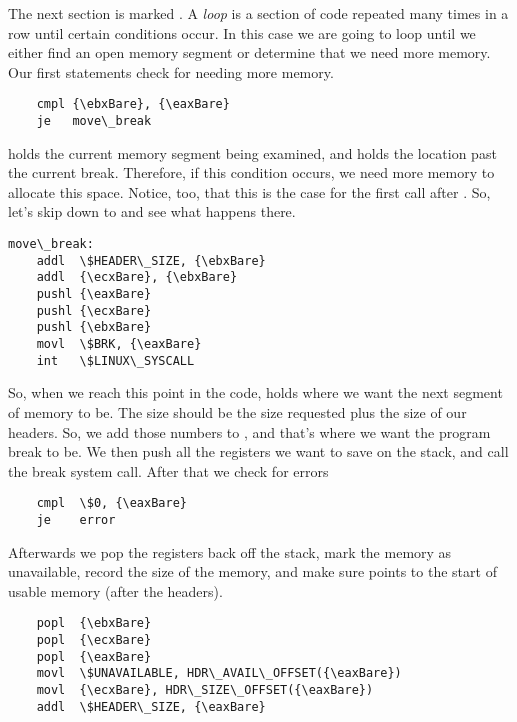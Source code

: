 The next section is marked .  A \emph{loop}
is a section of code repeated many times in a row until certain conditions occur.  In this
case we are going to loop until we either find an open memory segment or determine that
we need more memory.  Our first statements check for needing more memory.

\begin{simpletyping}
\begin{lstlisting}
	cmpl {\ebxBare}, {\eaxBare}
	je   move\_break
\end{lstlisting}
\end{simpletyping}

\icode{{\eaxBare}} holds the current memory segment being examined, and \icode{{\ebxBare}}
holds the location past the current break.  Therefore, if this condition occurs, we need more 
memory to allocate this space.  Notice, too, that this is the case for the first call after
.  So, let's skip down to  and
see what happens there.

\begin{simpletyping}
\begin{lstlisting}
move\_break:
	addl  \$HEADER\_SIZE, {\ebxBare}
	addl  {\ecxBare}, {\ebxBare}
	pushl {\eaxBare}
	pushl {\ecxBare}
	pushl {\ebxBare}
	movl  \$BRK, {\eaxBare}
	int   \$LINUX\_SYSCALL
\end{lstlisting}
\end{simpletyping}

So, when we reach this point in the code, \icode{{\ebxBare}} holds where we want the next
segment of memory to be.  The size should be the size requested plus the size of our headers.  So,
we add those numbers to \icode{{\ebxBare}}, and that's where we want the program break to be.
We then push all the registers we want to save on the stack, and call the break system call. After 
that we check for errors

\begin{simpletyping}
\begin{lstlisting}
	cmpl  \$0, {\eaxBare}
	je    error
\end{lstlisting}
\end{simpletyping}

Afterwards we pop the registers back off the stack, mark the memory as unavailable, record
the size of the memory, and make sure \icode{{\eaxBare}} points to the start of usable
memory (after the headers).

\begin{simpletyping}
\begin{lstlisting}
	popl  {\ebxBare}
	popl  {\ecxBare}
	popl  {\eaxBare}
	movl  \$UNAVAILABLE, HDR\_AVAIL\_OFFSET({\eaxBare})
	movl  {\ecxBare}, HDR\_SIZE\_OFFSET({\eaxBare})
	addl  \$HEADER\_SIZE, {\eaxBare}
\end{lstlisting}
\end{simpletyping}

